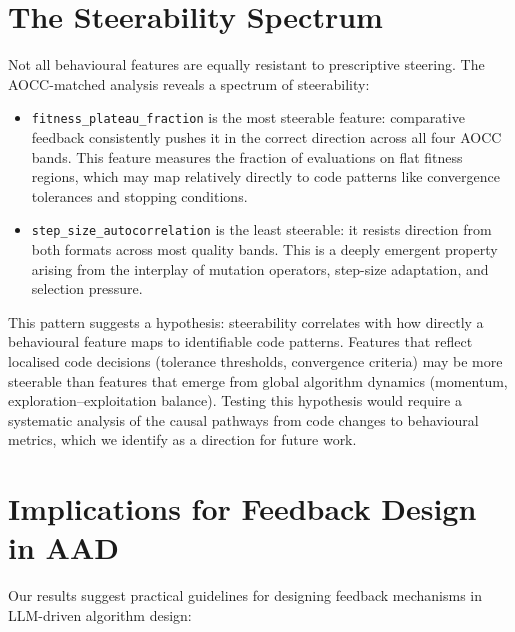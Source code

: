 \section{The Steerability Spectrum}
\label{sec:disc-steerability}

Not all behavioural features are equally resistant to prescriptive steering. The AOCC-matched analysis reveals a spectrum of steerability:

\begin{itemize}
  \item \texttt{fitness\_plateau\_fraction} is the most steerable feature: comparative feedback consistently pushes it in the correct direction across all four AOCC bands. This feature measures the fraction of evaluations on flat fitness regions, which may map relatively directly to code patterns like convergence tolerances and stopping conditions.
  \item \texttt{step\_size\_autocorrelation} is the least steerable: it resists direction from both formats across most quality bands. This is a deeply emergent property arising from the interplay of mutation operators, step-size adaptation, and selection pressure.
\end{itemize}

This pattern suggests a hypothesis: steerability correlates with how directly a behavioural feature maps to identifiable code patterns. Features that reflect localised code decisions (tolerance thresholds, convergence criteria) may be more steerable than features that emerge from global algorithm dynamics (momentum, exploration--exploitation balance). Testing this hypothesis would require a systematic analysis of the causal pathways from code changes to behavioural metrics, which we identify as a direction for future work.

\section{Implications for Feedback Design in AAD}
\label{sec:disc-implications}

Our results suggest practical guidelines for designing feedback mechanisms in LLM-driven algorithm design:

